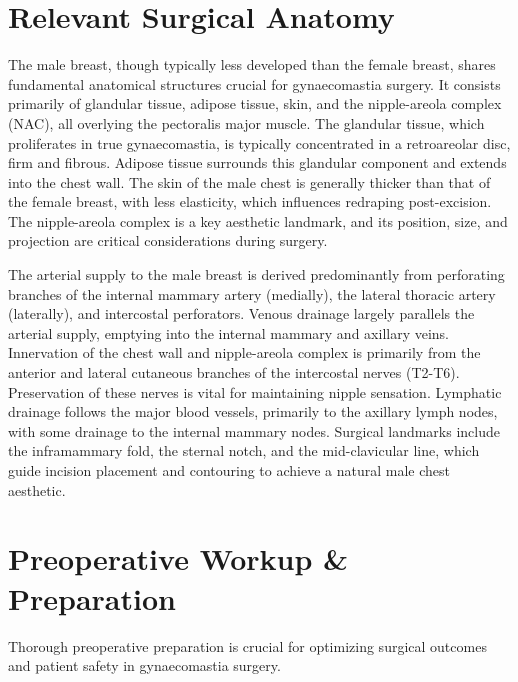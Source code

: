 \section*{Relevant Surgical Anatomy}
The male breast, though typically less developed than the female breast, shares fundamental anatomical structures crucial for gynaecomastia surgery. It consists primarily of glandular tissue, adipose tissue, skin, and the nipple-areola complex (NAC), all overlying the pectoralis major muscle. The glandular tissue, which proliferates in true gynaecomastia, is typically concentrated in a retroareolar disc, firm and fibrous. Adipose tissue surrounds this glandular component and extends into the chest wall. The skin of the male chest is generally thicker than that of the female breast, with less elasticity, which influences redraping post-excision. The nipple-areola complex is a key aesthetic landmark, and its position, size, and projection are critical considerations during surgery.

The arterial supply to the male breast is derived predominantly from perforating branches of the internal mammary artery (medially), the lateral thoracic artery (laterally), and intercostal perforators. Venous drainage largely parallels the arterial supply, emptying into the internal mammary and axillary veins. Innervation of the chest wall and nipple-areola complex is primarily from the anterior and lateral cutaneous branches of the intercostal nerves (T2-T6). Preservation of these nerves is vital for maintaining nipple sensation. Lymphatic drainage follows the major blood vessels, primarily to the axillary lymph nodes, with some drainage to the internal mammary nodes. Surgical landmarks include the inframammary fold, the sternal notch, and the mid-clavicular line, which guide incision placement and contouring to achieve a natural male chest aesthetic.

\section*{Preoperative Workup \& Preparation}
Thorough preoperative preparation is crucial for optimizing surgical outcomes and patient safety in gynaecomastia surgery.

